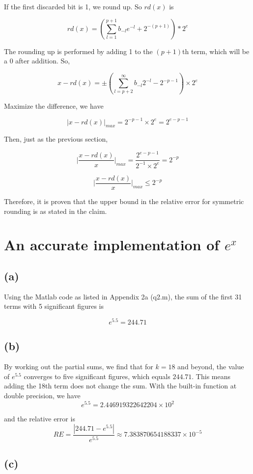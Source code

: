 \documentclass[a4paper, 12pt]{article}
\begin{document}
If the first discarded bit is 1, we round up. So $rd(x)$ is 

\[rd(x) = (\sum ^{p+1}_{l=1} b_{-l}e^{-l} + 2^{-(p+1)})*2^e\]

The rounding up is performed by adding 1 to the $(p+1)$th term, which will be a 0 after addition. So,

\[x-rd(x) = \pm (\sum ^\infty _{l=p+2} b_{-l}2^{-l} - 2^{-p-1})\times 2^e\]

Maximize the difference, we have

\[\vert x-rd(x) \vert _{max} = 2^{-p-1}\times 2^e = 2^{e-p-1}\]

Then, just as the previous section, 

\[\vert \frac{x-rd(x)}{x} \vert _{max} = \frac{2^{e-p-1}}{2^{-1}\times 2^e} = 2^{-p}\]

\[\vert \frac{x-rd(x)}{x} \vert _{max} \leq 2^{-p}\]

Therefore, it is proven that the upper bound in the relative error for symmetric rounding is as stated in the claim.

\section{An accurate implementation of $e^x$}


\subsection*{(a)}
Using the Matlab code as listed in Appendix 2a (q2.m), the sum of the first 31 terms with 5 significant figures is

\[e^{5.5} = 244.71\]

\subsection*{(b)}
By working out the partial sums, we find that for $k = 18$ and beyond, the value of $e^{5.5}$ converges to five significant figures, which equals $244.71$. This means adding the 18th term does not change the sum. With the built-in function at double precision, we have
\[e^{5.5} = 2.446919322642204\times 10^2\]

and the relative error is
\[RE =\frac{|244.71-e^{5.5}|}{e^{5.5}} \approx 7.383870654188337\times 10^{-5}\]

\subsection*{(c)}
\end{document}
